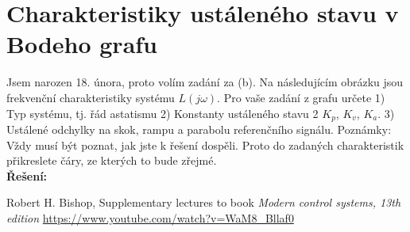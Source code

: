 \documentclass[twoside]{article}
\begin{document}
\section{Charakteristiky ustáleného stavu v Bodeho grafu}
Jsem narozen 18. února, proto volím zadání za (b).
Na následujícím obrázku jsou frekvenční charakteristiky systému $L(j\omega)$. 
Pro vaše zadání z grafu určete
1) Typ systému, tj. řád astatismu
2) Konstanty ustáleného stavu 2 $K_p$, $K_v$, $K_a$.
3) Ustálené odchylky na skok, rampu a parabolu referenčního signálu.
Poznámky: Vždy musí být poznat, jak jste k řešení dospěli. Proto do zadaných charakteristik
přikreslete čáry, ze kterých to bude zřejmé. \\
\textbf{Řešení:}


\begin{thebibliography}{9}

	Robert H. Bishop, Supplementary lectures to book \emph{Modern control systems, 13th edition} 
		\url{https://www.youtube.com/watch?v=WaM8_Bllaf0}

\end{thebibliography}
\end{document}
